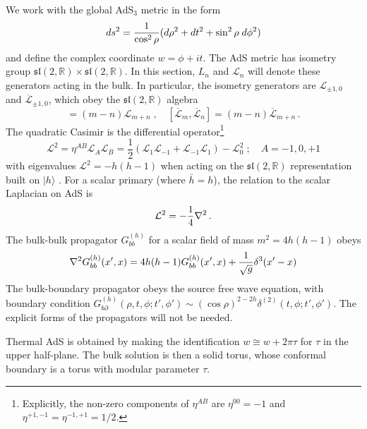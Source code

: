 \documentclass[12pt]{article}
\newcommand{\sltwo}{$\lie{sl}(2,\RR)$ }
\def\Lc{\mathcal{L}}
\def\Lcb{\overline{\mathcal{L}}}
\def\p{\partial}
\newcommand{\RR}{\mathbb{R}}
\newcommand{\lie}[1]{\mathfrak{#1}}
\begin{document}
We work with the global AdS$_3$ metric in the form
%
\begin{equation} ds^2 = {1\over\cos^2 \rho}(d\rho^2 + dt^2 +\sin^2 \rho \; d\phi^2)\end{equation}
%
and define the complex coordinate $w=\phi+it$. The AdS metric has isometry group $\lie{sl}(2,\RR)\times\lie{sl}(2,\RR)$. In this section, $L_n$ and $\Lc_n$ will denote these generators acting in the bulk.   In particular, the isometry generators are $\Lc_{\pm 1, 0}$ and $\Lcb_{\pm 1,0}$, which obey the \sltwo algebra
%
\begin{equation} [\Lc_m,\Lc_n] = (m-n)\Lc_{m+n}\;,\quad  [\Lcb_m,\Lcb_n] = (m-n)\Lcb_{m+n} \,.
 \end{equation}
%
The quadratic Casimir is the differential operator\footnote{Explicitly, the non-zero components of $\eta^{AB}$ are $\eta^{00}=-1$ and $\eta^{+1,-1}=\eta^{-1,+1}=1/2$.}
%
\begin{equation}
\label{eq:bulkCasimir}
\Lc^2 = \eta^{AB}\Lc_A \Lc_B
= \frac{1}{2}(\Lc_1 \Lc_{-1}+\Lc_{-1}\Lc_1)-\Lc_0^2 \; ; \quad  A=-1,0,+1
 \end{equation}
%
with eigenvalues $\Lc^2 = -h(h-1)$ when acting on the \sltwo representation built on $|h\rangle$ .  For a scalar primary (where $\bar{h}=h$), the relation to the scalar Laplacian on AdS is
%
\begin{equation}
 \label{eq:bulkCasimir2}
\Lc^2 = -{1\over 4}\nabla^2 \,.
\end{equation}
%
The bulk-bulk propagator $G_{bb}^{(h)}$ for a scalar field of mass $m^2=4h(h-1)$ obeys
%
\begin{equation}  \nabla^2 G_{bb}^{(h)}(x',x) =4h(h-1)G_{bb}^{(h)}(x',x)+{1\over \sqrt{g}}\delta^3(x'-x)
\end{equation}
%
The bulk-boundary propagator obeys the source free wave equation, with boundary condition $G^{(h)}_{b\p}(\rho,t,\phi; t',\phi') \sim (\cos \rho)^{2-2h} \delta^{(2)}(t,\phi; t',\phi')$.  The explicit forms of the propagators will not be needed.

Thermal AdS is obtained by making the identification $w \cong w+2\pi \tau$ for $\tau$ in the upper half-plane.  The bulk solution is then a solid torus, whose conformal boundary is a torus with modular parameter $\tau$.
\end{document}
